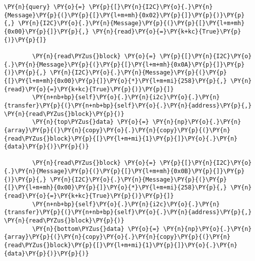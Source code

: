 \begin{tcolorbox}[breakable, size=fbox, boxrule=1pt, pad at break*=1mm,colback=cellbackground, colframe=cellborder]
\begin{Verbatim}[commandchars=\\\{\}]
		\PY{n}{query} \PY{o}{=} \PY{p}{[}\PY{n}{I2C}\PY{o}{.}\PY{n}{Message}\PY{p}{(}\PY{p}{[}\PY{l+m+mh}{0x02}\PY{p}{]}\PY{p}{)}\PY{p}{,} \PY{n}{I2C}\PY{o}{.}\PY{n}{Message}\PY{p}{(}\PY{p}{[}\PY{l+m+mh}{0x00}\PY{p}{]}\PY{p}{,} \PY{n}{read}\PY{o}{=}\PY{k+kc}{True}\PY{p}{)}\PY{p}{]}

		\PY{n}{read\PYZus{}block} \PY{o}{=} \PY{p}{[}\PY{n}{I2C}\PY{o}{.}\PY{n}{Message}\PY{p}{(}\PY{p}{[}\PY{l+m+mh}{0x0A}\PY{p}{]}\PY{p}{)}\PY{p}{,} \PY{n}{I2C}\PY{o}{.}\PY{n}{Message}\PY{p}{(}\PY{p}{[}\PY{l+m+mh}{0x00}\PY{p}{]}\PY{o}{*}\PY{l+m+mi}{258}\PY{p}{,} \PY{n}{read}\PY{o}{=}\PY{k+kc}{True}\PY{p}{)}\PY{p}{]}
		\PY{n+nb+bp}{self}\PY{o}{.}\PY{n}{i2c}\PY{o}{.}\PY{n}{transfer}\PY{p}{(}\PY{n+nb+bp}{self}\PY{o}{.}\PY{n}{address}\PY{p}{,} \PY{n}{read\PYZus{}block}\PY{p}{)}
		\PY{n}{top\PYZus{}data} \PY{o}{=} \PY{n}{np}\PY{o}{.}\PY{n}{array}\PY{p}{(}\PY{n}{copy}\PY{o}{.}\PY{n}{copy}\PY{p}{(}\PY{n}{read\PYZus{}block}\PY{p}{[}\PY{l+m+mi}{1}\PY{p}{]}\PY{o}{.}\PY{n}{data}\PY{p}{)}\PY{p}{)}

		\PY{n}{read\PYZus{}block} \PY{o}{=} \PY{p}{[}\PY{n}{I2C}\PY{o}{.}\PY{n}{Message}\PY{p}{(}\PY{p}{[}\PY{l+m+mh}{0x0B}\PY{p}{]}\PY{p}{)}\PY{p}{,} \PY{n}{I2C}\PY{o}{.}\PY{n}{Message}\PY{p}{(}\PY{p}{[}\PY{l+m+mh}{0x00}\PY{p}{]}\PY{o}{*}\PY{l+m+mi}{258}\PY{p}{,} \PY{n}{read}\PY{o}{=}\PY{k+kc}{True}\PY{p}{)}\PY{p}{]}
		\PY{n+nb+bp}{self}\PY{o}{.}\PY{n}{i2c}\PY{o}{.}\PY{n}{transfer}\PY{p}{(}\PY{n+nb+bp}{self}\PY{o}{.}\PY{n}{address}\PY{p}{,} \PY{n}{read\PYZus{}block}\PY{p}{)}
		\PY{n}{bottom\PYZus{}data} \PY{o}{=} \PY{n}{np}\PY{o}{.}\PY{n}{array}\PY{p}{(}\PY{n}{copy}\PY{o}{.}\PY{n}{copy}\PY{p}{(}\PY{n}{read\PYZus{}block}\PY{p}{[}\PY{l+m+mi}{1}\PY{p}{]}\PY{o}{.}\PY{n}{data}\PY{p}{)}\PY{p}{)}


\end{Verbatim}
\end{tcolorbox}
